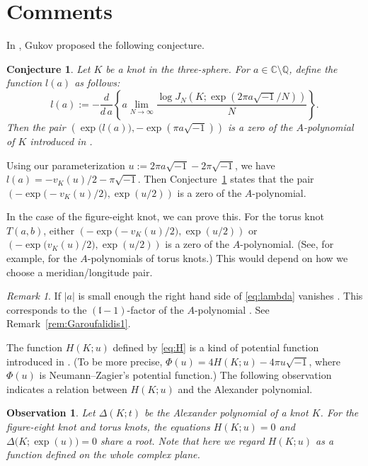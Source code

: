 \documentclass[a4paper]{amsart}
\theoremstyle{plain}
\newtheorem{conj}[thm]{Conjecture}
\newtheorem{obs}[thm]{Observation}
\theoremstyle{definition}
\theoremstyle{remark}
\newtheorem{rem}[thm]{Remark}
\newcommand{\C}{\mathbb{C}}
\newcommand{\Q}{\mathbb{Q}}
\numberwithin{equation}{section}
\begin{document}
\section{Comments}
In \cite[(5.29)]{Gukov:COMMP2005}, Gukov proposed the following conjecture.
\begin{conj}\cite{Gukov:COMMP2005}\label{conj:Gukov}
Let $K$ be a knot in the three-sphere.
For $a\in\C\setminus\Q$, define the function $l(a)$ as follows:
\begin{equation}\label{eq:lambda}
  l(a):=
  -\frac{d}{d\,a}
  \left\{
    a\lim_{N\to\infty}
    \frac{\log{J_N\left(K;\exp(2\pi{a}\sqrt{-1}/N)\right)}}{N}
  \right\}.
\end{equation}
Then the pair $\left(\exp\bigl(l(a)\bigr),-\exp(\pi{a}\sqrt{-1})\right)$ is a zero of the $A$-polynomial of $K$ introduced in
\cite{Cooper/Culler/Gillet/Long/Shalen:INVEM1994}.
\end{conj}
Using our parameterization $u:=2\pi{a}\sqrt{-1}-2\pi\sqrt{-1}$, we have
$l(a)=-v_{K}(u)/2-\pi\sqrt{-1}$.
Then Conjecture~\ref{conj:Gukov} states that the pair
$\left(-\exp\bigl(-v_{K}(u)/2\bigr),\exp(u/2)\right)$
is a zero of the $A$-polynomial.
\par
In the case of the figure-eight knot, we can prove this.
For the torus knot $T(a,b)$, either
$\left(-\exp\bigl(-v_{K}(u)/2\bigr),\exp(u/2)\right)$ or 
$\left(-\exp\bigl(v_{K}(u)/2\bigr),\exp(u/2)\right)$ is a zero of the $A$-polynomial.
(See, for example, \cite[Example~4.1]{XZhang:2004} for the $A$-polynomials of torus knots.)
This would depend on how we choose a meridian/longitude pair.
\begin{rem}\label{rem:Garoufalidis2}
If $|a|$ is small enough the right hand side of \eqref{eq:lambda} vanishes \cite{Garoufalidis/Le:Kauffman}.
This corresponds to the $(\mathfrak{l}-1)$-factor of the $A$-polynomial
\cite[2.5]{Cooper/Culler/Gillet/Long/Shalen:INVEM1994}.
See Remark~\ref{rem:Garoufalidis1}.
\end{rem}
The function $H(K;u)$ defined by \eqref{eq:H} is a kind of potential function introduced in \cite[Theorem~3]{Neumann/Zagier:TOPOL85}.
(To be more precise, $\Phi(u)=4H(K;u)-4\pi{u}\sqrt{-1}$, where $\Phi(u)$ is Neumann--Zagier's potential function.)
The following observation indicates a relation between $H(K;u)$ and the Alexander polynomial.
\begin{obs}
Let $\Delta(K;t)$ be the Alexander polynomial of a knot $K$.
For the figure-eight knot and torus knots, the equations $H(K;u)=0$ and $\Delta\bigl(K;\exp(u)\bigr)=0$ share a root.
Note that here we regard $H(K;u)$ as a function defined on the whole complex plane.
\end{obs}
\end{document}

